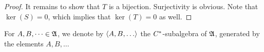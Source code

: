\begin{proof}
 It remains to show that $T$ is a bijection.
 Surjectivity is obvious. Note that $\ker(S) =0$, which implies that 
 $\ker(T)=0$ as well.
 \end{proof}

For $A, B, \dots \in \mathfrak{A}$, we denote by $\gen{A, B, \dots}$ the
$C^{*}$-subalgebra of $\mathfrak{A}$, generated by the elements $A, B, \dots$


% 
% 

 
















